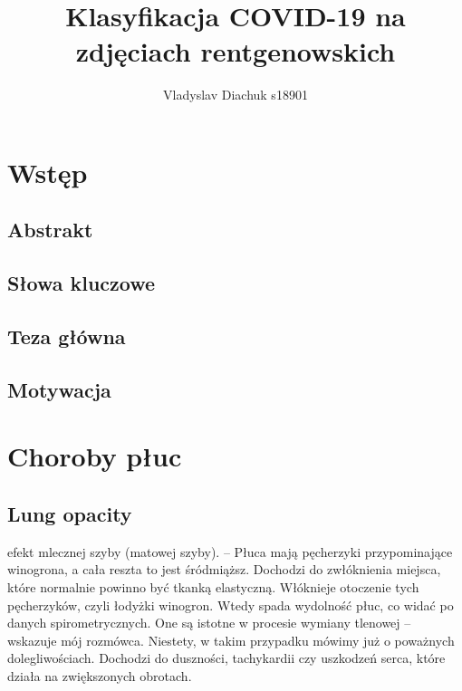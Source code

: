 \documentclass{article}
\title{Klasyfikacja COVID-19 na zdjęciach rentgenowskich}
\author{Vladyslav Diachuk s18901}
\begin{document}
\maketitle


\section{Wstęp}

\subsection{Abstrakt}


\subsection{Słowa kluczowe}


\subsection{Teza główna}

\subsection{Motywacja}


\section{Choroby płuc}

\subsection{Lung opacity}
efekt mlecznej szyby (matowej szyby). – Płuca mają pęcherzyki przypominające winogrona, a cała reszta to jest śródmiąższ. Dochodzi do zwłóknienia miejsca, które normalnie powinno być tkanką elastyczną. Włóknieje otoczenie tych pęcherzyków, czyli łodyżki winogron. Wtedy spada wydolność płuc, co widać po danych spirometrycznych. One są istotne w procesie wymiany tlenowej – wskazuje mój rozmówca.
Niestety, w takim przypadku mówimy już o poważnych dolegliwościach. Dochodzi do duszności, tachykardii czy uszkodzeń serca, które działa na zwiększonych obrotach.
\end{document}
